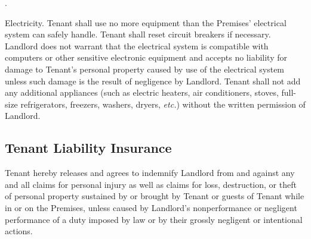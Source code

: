 \documentclass{article}
\begin{document}
\begin{compactList}{.}{}
  \item {\titleStyle Electricity.} Tenant shall use no more equipment than the
  Premises’ electrical system can safely handle. Tenant shall reset circuit
  breakers if necessary. Landlord does not warrant that the electrical system is
  compatible with computers or other sensitive electronic equipment and accepts
  no liability for damage to Tenant’s personal property caused by use of the
  electrical system unless such damage is the result of negligence by Landlord.
  Tenant shall not add any additional appliances (such as electric heaters, air
  conditioners, stoves, full-size refrigerators, freezers, washers, dryers,
  \textit{etc.}) without the written permission of Landlord.
\end{compactList}

\subsection{Tenant Liability Insurance}
%
Tenant hereby releases and agrees to indemnify
Landlord from and against any and all claims for personal injury as well as
claims for loss, destruction, or theft of personal property sustained by or
brought by Tenant or guests of Tenant while in or on the Premises, unless caused
by Landlord’s nonperformance or negligent performance of a duty imposed by law
or by their grossly negligent or intentional actions.

\hspace*{\dimexpr-\oddsidemargin-1in-\hoffset\relax}%
\restoregeometry
\end{document}

